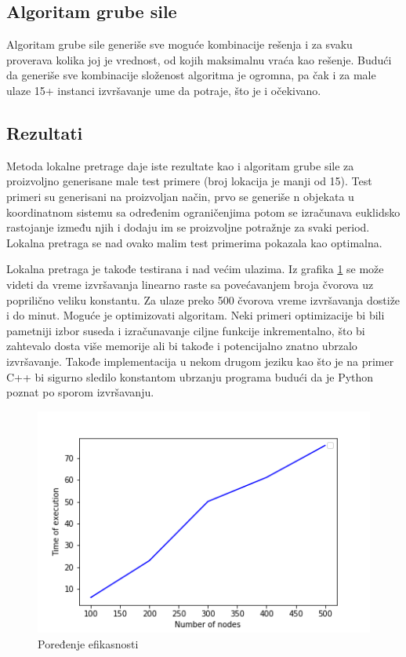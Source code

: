 \documentclass[a4paper]{article}
\begin{document}
\subsection{Algoritam grube sile}
Algoritam grube sile generiše sve moguće kombinacije rešenja i za svaku proverava kolika joj je vrednost, od kojih maksimalnu vraća kao rešenje. Budući da generiše sve kombinacije složenost algoritma je ogromna, pa čak i za male ulaze 15+ instanci izvršavanje ume da potraje, što je i očekivano.

\subsection{Rezultati}



Metoda lokalne pretrage daje iste rezultate kao i algoritam grube sile za proizvoljno generisane male test primere (broj lokacija je manji od 15). Test primeri su generisani na proizvoljan način, prvo se generiše n objekata u koordinatnom sistemu sa određenim ograničenjima potom se izračunava euklidsko rastojanje između njih i dodaju im se proizvoljne potražnje za svaki period. Lokalna pretraga se nad ovako malim test primerima pokazala kao optimalna.

Lokalna pretraga je takođe testirana i nad većim ulazima. Iz grafika \ref{fig1} se može videti da vreme izvršavanja linearno raste sa povećavanjem broja čvorova uz poprilično veliku konstantu. Za ulaze preko 500 čvorova vreme izvršavanja dostiže i do minut. Moguće je optimizovati algoritam. Neki primeri optimizacije bi bili pametniji izbor suseda i izračunavanje ciljne funkcije inkrementalno, što bi zahtevalo dosta više memorije ali bi takođe i potencijalno znatno ubrzalo izvršavanje. Takođe implementacija u nekom drugom jeziku kao što je na primer C++ bi sigurno sledilo konstantom ubrzanju programa budući da je Python poznat po sporom izvršavanju.


\begin{figure}
	\centering
	\includegraphics[scale=0.5]{resources/execution_time.png}
	\caption{Poređenje efikasnosti}
	\label{fig1}
\end{figure}
\end{document}
